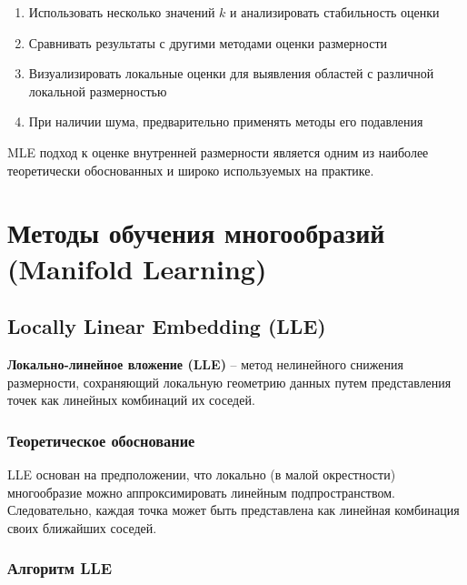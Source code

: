 \documentclass[a4paper,12pt]{article}
\begin{document}
\begin{enumerate}
    \item Использовать несколько значений $k$ и анализировать стабильность оценки
    \item Сравнивать результаты с другими методами оценки размерности
    \item Визуализировать локальные оценки для выявления областей с различной локальной размерностью
    \item При наличии шума, предварительно применять методы его подавления
\end{enumerate}

MLE подход к оценке внутренней размерности является одним из наиболее теоретически обоснованных и широко используемых на практике.


\section{Методы обучения многообразий (Manifold Learning)}

\subsection{Locally Linear Embedding (LLE)}

\textbf{Локально-линейное вложение (LLE)} -- метод нелинейного снижения размерности, сохраняющий локальную геометрию данных путем представления точек как линейных комбинаций их соседей.

\subsubsection{Теоретическое обоснование}

LLE основан на предположении, что локально (в малой окрестности) многообразие можно аппроксимировать линейным подпространством. Следовательно, каждая точка может быть представлена как линейная комбинация своих ближайших соседей.

\subsubsection{Алгоритм LLE}
\end{document}
